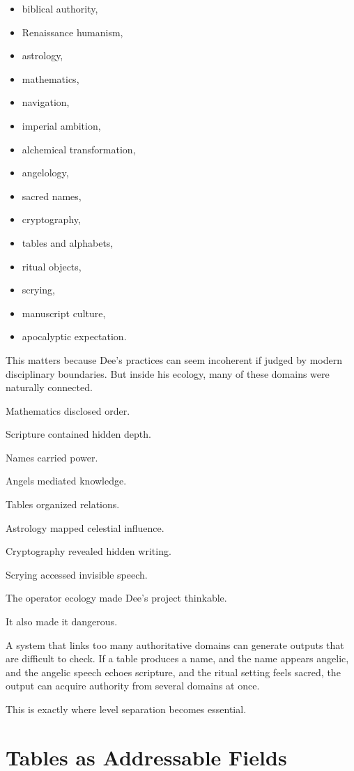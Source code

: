 \documentclass[11pt]{book}
\begin{document}
\begin{itemize}
    \item biblical authority,
    \item Renaissance humanism,
    \item astrology,
    \item mathematics,
    \item navigation,
    \item imperial ambition,
    \item alchemical transformation,
    \item angelology,
    \item sacred names,
    \item cryptography,
    \item tables and alphabets,
    \item ritual objects,
    \item scrying,
    \item manuscript culture,
    \item apocalyptic expectation.
\end{itemize}

This matters because Dee's practices can seem incoherent if judged by modern disciplinary boundaries. But inside his ecology, many of these domains were naturally connected.

Mathematics disclosed order.

Scripture contained hidden depth.

Names carried power.

Angels mediated knowledge.

Tables organized relations.

Astrology mapped celestial influence.

Cryptography revealed hidden writing.

Scrying accessed invisible speech.

The operator ecology made Dee's project thinkable.

It also made it dangerous.

A system that links too many authoritative domains can generate outputs that are difficult to check. If a table produces a name, and the name appears angelic, and the angelic speech echoes scripture, and the ritual setting feels sacred, the output can acquire authority from several domains at once.

This is exactly where level separation becomes essential.

\section{Tables as Addressable Fields}
\end{document}
